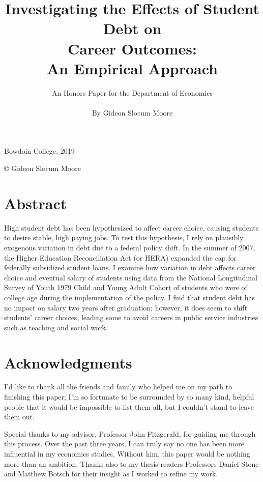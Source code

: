 \documentclass[12pt]{article}
\title{\vfill Investigating the Effects of Student Debt on \\ Career Outcomes: \\ An Empirical Approach \vfill}
\author{An Honors Paper for the Department of Economics \\ \\ By Gideon Slocum Moore}
\date{}
\begin{document}
	{ \maketitle}
	\thispagestyle{empty}
	\vfill
	
	

	\begin{center}
		Bowdoin College, 2019

		\copyright {} Gideon Slocum Moore
	\end{center}

	\vfill

	\pagebreak
	
	\setcounter{page}{1}
	
	\section*{Abstract}
	
	High student debt has been hypothesized to affect career choice, causing students to desire stable, high paying jobs. To test this hypothesis, I rely on plausibly exogenous variation in debt due to a federal policy shift. In the summer of 2007, the Higher Education Reconciliation Act (or HERA) expanded the cap for federally subsidized student loans. I examine how variation in debt affects career choice and eventual salary of students using data from the National Longitudinal Survey of Youth 1979 Child and Young Adult Cohort of students who were of college age during the implementation of the policy. I find that student debt has no impact on salary two years after graduation; however, it does seem to shift students' career choices, leading some to avoid careers in public service industries such as teaching and social work.
	
	\pagebreak
	
	\section*{Acknowledgments}
	
	I'd like to thank all the friends and family who helped me on my path to finishing this paper; I'm so fortunate to be surrounded by so many kind, helpful people that it would be impossible to list them all, but I couldn't stand to leave them out.
	
	Special thanks to my advisor, Professor John Fitzgerald, for guiding me through this process. Over the past three years, I can truly say no one has been more influential in my economics studies. Without him, this paper would be nothing more than an ambition. Thanks also to my thesis readers Professors Daniel Stone and Matthew Botsch for their insight as I worked to refine my work.
	
\end{document}
